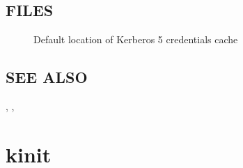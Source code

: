 \documentclass[letterpaper,10pt,english]{sphinxmanual}
\begin{document}
\subsection{FILES}
\label{\detokenize{user/user_commands/kdestroy:files}}\begin{description}
\item[{}] \leavevmode
\sphinxAtStartPar
Default location of Kerberos 5 credentials cache

\end{description}


\subsection{SEE ALSO}
\label{\detokenize{user/user_commands/kdestroy:see-also}}
\sphinxAtStartPar
{\hyperref[\detokenize{user/user_commands/kinit:kinit-1}]{}}, {\hyperref[\detokenize{user/user_commands/klist:klist-1}]{}}, {\hyperref[\detokenize{user/user_config/kerberos:kerberos-7}]{}}


\section{kinit}
\label{\detokenize{user/user_commands/kinit:kinit}}\label{\detokenize{user/user_commands/kinit:kinit-1}}\label{\detokenize{user/user_commands/kinit::doc}}
\end{document}
